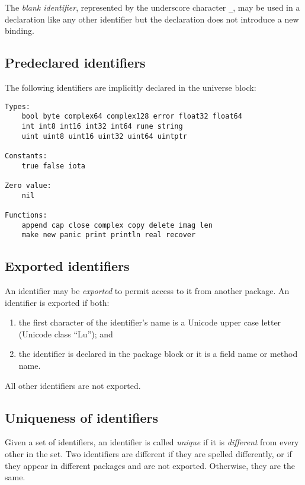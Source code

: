 {The \emph{blank identifier}, represented by the underscore character
\texttt{\_}, may be used in a declaration like any other identifier but
the declaration does not introduce a new binding.

\subsection*{Predeclared identifiers}

The following identifiers are implicitly declared in the
universe block:

\begin{Verbatim}[frame=single]
Types:
    bool byte complex64 complex128 error float32 float64
    int int8 int16 int32 int64 rune string
    uint uint8 uint16 uint32 uint64 uintptr

Constants:
    true false iota

Zero value:
    nil

Functions:
    append cap close complex copy delete imag len
    make new panic print println real recover
\end{Verbatim}

\subsection*{Exported identifiers}

An identifier may be \emph{exported} to permit access to it from another
package. An identifier is exported if both:

\begin{enumerate}
\item
  the first character of the identifier's name is a Unicode upper case
  letter (Unicode class ``Lu''); and
\item
  the identifier is declared in the package block or
  it is a field name or
  method name.
\end{enumerate}

All other identifiers are not exported.

\subsection*{Uniqueness of identifiers}

Given a set of identifiers, an identifier is called \emph{unique} if it
is \emph{different} from every other in the set. Two identifiers are
different if they are spelled differently, or if they appear in
different packages and are not
exported. Otherwise, they are the
same.

}

